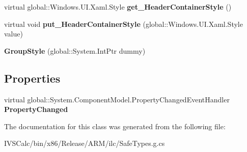 \begin{DoxyCompactItemize}
virtual global\+::\+Windows.\+U\+I.\+Xaml.\+Style {\bfseries get\+\_\+\+Header\+Container\+Style} ()
\item 
\mbox{\label{class_windows_1_1_u_i_1_1_xaml_1_1_controls_1_1_group_style_aab18a3e263942f9bedd80679e89e0fba}} 
virtual void {\bfseries put\+\_\+\+Header\+Container\+Style} (global\+::\+Windows.\+U\+I.\+Xaml.\+Style value)
\item 
\mbox{\label{class_windows_1_1_u_i_1_1_xaml_1_1_controls_1_1_group_style_a48ddd6c81df5d4b20a17360153322649}} 
{\bfseries Group\+Style} (global\+::\+System.\+Int\+Ptr dummy)
\end{DoxyCompactItemize}
\subsection*{Properties}
\begin{DoxyCompactItemize}
\item 
\mbox{\label{class_windows_1_1_u_i_1_1_xaml_1_1_controls_1_1_group_style_a4d74815f60276dd8feb7c6099b73789b}} 
virtual global\+::\+System.\+Component\+Model.\+Property\+Changed\+Event\+Handler {\bfseries Property\+Changed}
\end{DoxyCompactItemize}


The documentation for this class was generated from the following file\+:\begin{DoxyCompactItemize}
\item 
I\+V\+S\+Calc/bin/x86/\+Release/\+A\+R\+M/ilc/Safe\+Types.\+g.\+cs\end{DoxyCompactItemize}
